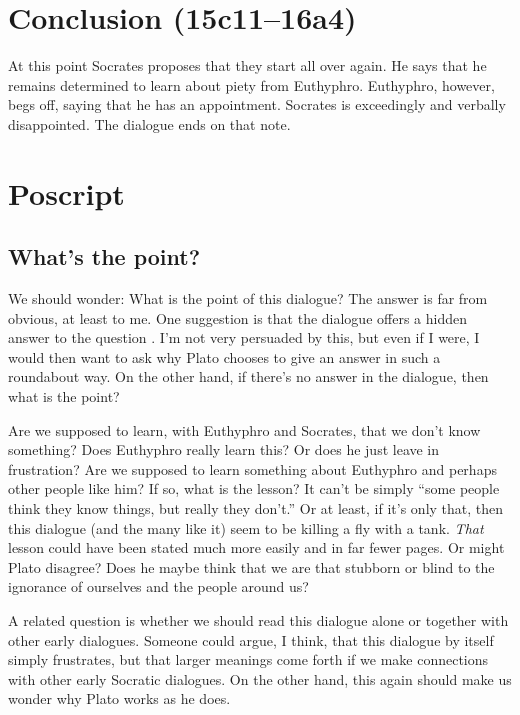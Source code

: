 \documentclass[11pt]{article}
\begin{document}


\section{Conclusion (15c11--16a4)}

At this point Socrates proposes that they start all over again.  He says
that he remains determined to learn about piety from Euthyphro.  Euthyphro,
however, begs off, saying that he has an appointment.  Socrates is
exceedingly and verbally disappointed.  The dialogue ends on that note.


\section{Poscript}

\subsection{What's the point?}

We should wonder: What is the point of this dialogue?  The answer is far
from obvious, at least to me.  One suggestion is that the dialogue offers
a hidden answer to the question .  I'm not very
persuaded by this, but even if I were, I would then want to ask why Plato
chooses to give an answer in such a roundabout way.  On the other hand, if
there's no answer in the dialogue, then what is the point?

Are we supposed to learn, with Euthyphro and Socrates, that we don't know
something?  Does Euthyphro really learn this?  Or does he just leave in
frustration?  Are we supposed to learn something about Euthyphro and
perhaps other people like him?  If so, what is the lesson?  It can't be
simply ``some people think they know things, but really they don't.''  Or at
least, if it's only that, then this dialogue (and the many like it) seem to
be killing a fly with a tank.  \emph{That} lesson could have been stated
much more easily and in far fewer pages.  Or might Plato disagree?  Does he
maybe think that we are that stubborn or blind to the ignorance of
ourselves and the people around us?

A related question is whether we should read this dialogue alone or
together with other early dialogues.  Someone could argue, I think, that
this dialogue by itself simply frustrates, but that larger meanings come
forth if we make connections with other early Socratic dialogues.  On the
other hand, this again should make us wonder why Plato works as he does.
\end{document}

